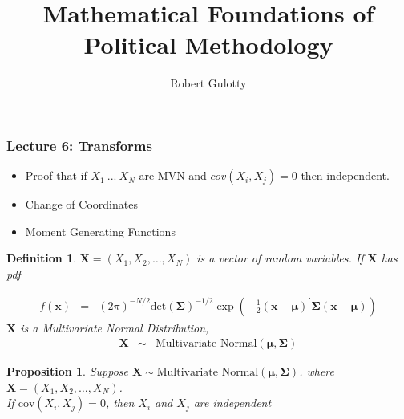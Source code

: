\documentclass{beamer}
\title[PLSC 43401]{Mathematical Foundations of Political Methodology}
\author{Robert Gulotty}
\institute[Chicago]{University of Chicago}
\newtheorem{prop}{Proposition}
\newtheorem{defn}{Definition}
\numberwithin{equation}{section}
\begin{document}
\begin{frame}
\maketitle
\end{frame}


\begin{frame}
\frametitle{Lecture 6: Transforms}
\begin{itemize}
\item Proof that if $X_1\ ...\ X_N$ are MVN and $cov(X_i,X_j)=0$ then independent.
\item Change of Coordinates
\item Moment Generating Functions
\end{itemize}
\end{frame}





\begin{frame}

\begin{defn}
$\boldsymbol{X} = (X_{1}, X_{2}, \hdots, X_{N}) $ is a vector of random variables.  If $\boldsymbol{X}$ has pdf 

\begin{eqnarray}
f(\boldsymbol{x}) & = & (2 \pi)^{-N/2} \text{det}\left(\boldsymbol{\Sigma}\right)^{-1/2} \exp\left(-\frac{1}{2}(\boldsymbol{x} - \boldsymbol{\mu})^{'}\boldsymbol{\Sigma} (\boldsymbol{x} - \boldsymbol{\mu} ) \right) \nonumber 
\end{eqnarray}
$\boldsymbol{X}$ is a \alert{Multivariate Normal} Distribution, 
\begin{eqnarray}
\boldsymbol{X} & \sim & \text{Multivariate Normal} (\boldsymbol{\mu}, \boldsymbol{\Sigma}) \nonumber 
\end{eqnarray}


\end{defn}


\end{frame}


\begin{frame}

\begin{prop}
Suppose $\boldsymbol{X} \sim \text{Multivariate Normal}(\boldsymbol{\mu}, \boldsymbol{\Sigma})$.  
where $\boldsymbol{X}= (X_{1}, X_{2}, \hdots, X_{N})$. \\
If $\text{cov}(X_{i}, X_{j})  = 0  $, then $X_{i}$ and $X_{j}$ are independent 

\end{prop}
\end{frame}
\end{document}
